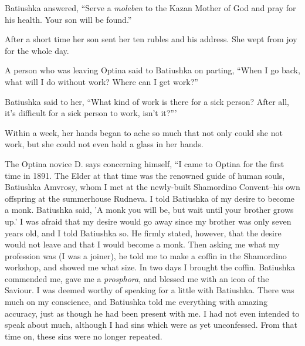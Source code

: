 Batiushka answered, “Serve a \textit{moleben} to the Kazan Mother of God and pray for his health. Your son will be found.”

After a short time her son sent her ten rubles and his address. She wept from joy for the whole day.

A person who was leaving Optina said to Batiushka on parting, “When I go back, what will I do without work? Where can I get work?”

Batiushka said to her, “What kind of work is there for a sick person? After all, it's difficult for a sick person to work, isn't it?”'

Within a week, her hands began to ache so much that not only could she not work, but she could not even hold a glass in her hands.

The Optina novice D. says concerning himself, “I came to Optina for the first time in 1891. The Elder at that time was the renowned guide of human souls, Batiushka Amvrosy, whom I met at the newly-built Shamordino Convent--his own offspring at the summerhouse Rudneva. I told Batiushka of my desire to become a monk. Batiushka said, 'A monk you will be, but wait until your brother grows up.' I was afraid that my desire would go away since my brother was only seven years old, and I told Batiushka so. He firmly stated, however, that the desire would not leave and that I would become a monk. Then asking me what my profession was (I was a joiner), he told me to make a coffin in the Shamordino workshop, and showed me what size. In two days I brought the coffin. Batiushka commended me, gave me a \textit{prosphora}, and blessed me with an icon of the Saviour. I was deemed worthy of speaking for a little with Batiushka. There was much on my conscience, and Batiushka told me everything with amazing accuracy, just as though he had been present with me. I had not even intended to speak about much, although I had sins which were as yet unconfessed. From that time on, these sins were no longer repeated.

